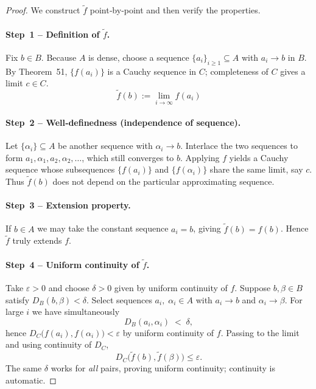 \documentclass[12pt]{article}
\theoremstyle{definition} %
\theoremstyle{plain} %
\begin{document}
\begin{proof}
  We construct $\tilde f$ point‑by‑point and then verify the properties.

  \paragraph{\textbf{Step 1 – Definition of $\tilde f$.}}
  Fix $b\in B$.  Because $A$ is dense, choose a sequence
  $\{a_i\}_{i\ge1}\subseteq A$ with $a_i\to b$ in $B$.
  By Theorem 51, $\{f(a_i)\}$ is a Cauchy sequence in $C$;
  completeness of $C$ gives a limit $c\in C$.
  \[
      \boxed{\;\tilde f(b):=\displaystyle\lim_{i\to\infty}f(a_i)\;}
  \]

  \paragraph{\textbf{Step 2 – Well‑definedness (independence of sequence).}}
  Let $\{\alpha_i\}\subseteq A$ be another sequence with $\alpha_i\to b$.
  Interlace the two sequences to form
  \(
      a_1,\alpha_1,a_2,\alpha_2,\dots
  \),
  which still converges to $b$.  
  Applying $f$ yields a Cauchy sequence whose subsequences
  $\{f(a_i)\}$ and $\{f(\alpha_i)\}$ share the same limit, say $c$.
  Thus $\tilde f(b)$ does not depend on the particular approximating
  sequence.

  \paragraph{\textbf{Step 3 – Extension property.}}
  If $b\in A$ we may take the constant sequence $a_i=b$,
  giving $\tilde f(b)=f(b)$.  Hence $\tilde f$ truly extends $f$.

  \paragraph{\textbf{Step 4 – Uniform continuity of $\tilde f$.}}
  Take $\varepsilon>0$ and choose $\delta>0$ given by uniform continuity
  of $f$.  
  Suppose $b,\beta\in B$ satisfy $D_B(b,\beta)<\delta$.
  Select sequences $a_i,\;\alpha_i\in A$ with
  $a_i\to b$ and $\alpha_i\to\beta$.
  For large $i$ we have simultaneously
  \[
      D_B(a_i,\alpha_i)\;<\;\delta,
  \]
  hence
  \(
      D_C\!\bigl(f(a_i),f(\alpha_i)\bigr)<\varepsilon
  \)
  by uniform continuity of $f$.
  Passing to the limit and using continuity of $D_C$,
  \[
      D_C\!\bigl(\tilde f(b),\tilde f(\beta)\bigr)\le\varepsilon.
  \]
  The same $\delta$ works for \emph{all} pairs, proving uniform
  continuity; continuity is automatic.


\end{proof}
\end{document}

